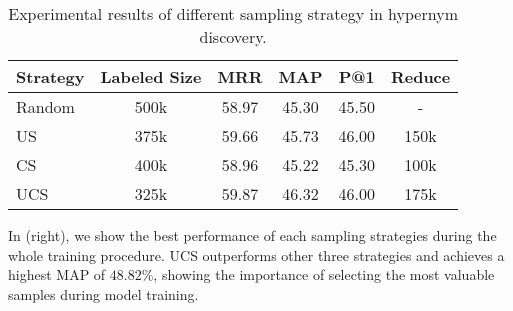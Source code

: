 \begin{table}[th]
	\centering
	\begin{tabular}{l|c|c|c|c|c}
		\hline
		Strategy & Labeled Size &  MRR & MAP & P@1 & Reduce \\
		\hline
		Random & 500k & 58.97 & 45.30 & 45.50 & - \\
		US  & 375k &  59.66 & 45.73 & 46.00 & 150k\\
		CS & 400k &  58.96 & 45.22 & 45.30 & 100k\\
		UCS  & 325k &  59.87 & 46.32 & 46.00 & 175k \\
		\hline
	\end{tabular}
	\caption{Experimental results of different sampling strategy in hypernym discovery.}
	\label{tab:isa}
\end{table}

In  (right), 
we show the best performance of each sampling strategies during the whole training procedure.
UCS outperforms other three strategies and achieves a highest MAP of $48.82\%$, showing the importance of selecting the most valuable samples during model training.




